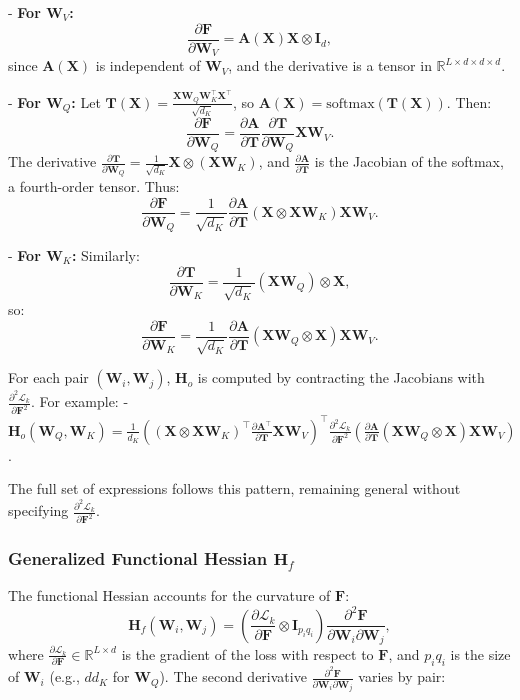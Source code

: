 \documentclass{article}
\begin{document}
- \textbf{For \(\mathbf{W}_V\):}
\[
\frac{\partial \mathbf{F}}{\partial \mathbf{W}_V} = \mathbf{A}(\mathbf{X}) \mathbf{X} \otimes \mathbf{I}_d,
\]
since \(\mathbf{A}(\mathbf{X})\) is independent of \(\mathbf{W}_V\), and the derivative is a tensor in \(\mathbb{R}^{L \times d \times d \times d}\).

- \textbf{For \(\mathbf{W}_Q\):}
Let \(\mathbf{T}(\mathbf{X}) = \frac{\mathbf{X} \mathbf{W}_Q \mathbf{W}_K^\top \mathbf{X}^\top}{\sqrt{d_K}}\), so \(\mathbf{A}(\mathbf{X}) = \text{softmax}(\mathbf{T}(\mathbf{X}))\). Then:
\[
\frac{\partial \mathbf{F}}{\partial \mathbf{W}_Q} = \frac{\partial \mathbf{A}}{\partial \mathbf{T}} \frac{\partial \mathbf{T}}{\partial \mathbf{W}_Q} \mathbf{X} \mathbf{W}_V.
\]
The derivative \(\frac{\partial \mathbf{T}}{\partial \mathbf{W}_Q} = \frac{1}{\sqrt{d_K}} \mathbf{X} \otimes (\mathbf{X} \mathbf{W}_K)\), and \(\frac{\partial \mathbf{A}}{\partial \mathbf{T}}\) is the Jacobian of the softmax, a fourth-order tensor. Thus:
\[
\frac{\partial \mathbf{F}}{\partial \mathbf{W}_Q} = \frac{1}{\sqrt{d_K}} \frac{\partial \mathbf{A}}{\partial \mathbf{T}} (\mathbf{X} \otimes \mathbf{X} \mathbf{W}_K) \mathbf{X} \mathbf{W}_V.
\]

- \textbf{For \(\mathbf{W}_K\):}
Similarly:
\[
\frac{\partial \mathbf{T}}{\partial \mathbf{W}_K} = \frac{1}{\sqrt{d_K}} (\mathbf{X} \mathbf{W}_Q) \otimes \mathbf{X},
\]
so:
\[
\frac{\partial \mathbf{F}}{\partial \mathbf{W}_K} = \frac{1}{\sqrt{d_K}} \frac{\partial \mathbf{A}}{\partial \mathbf{T}} (\mathbf{X} \mathbf{W}_Q \otimes \mathbf{X}) \mathbf{X} \mathbf{W}_V.
\]

For each pair \((\mathbf{W}_i, \mathbf{W}_j)\), \(\mathbf{H}_o\) is computed by contracting the Jacobians with \(\frac{\partial^2 \mathcal{L}_k}{\partial \mathbf{F}^2}\). For example:
- \(\mathbf{H}_o(\mathbf{W}_Q, \mathbf{W}_K) = \frac{1}{d_K} \left( (\mathbf{X} \otimes \mathbf{X} \mathbf{W}_K)^\top \frac{\partial \mathbf{A}^\top}{\partial \mathbf{T}} \mathbf{X} \mathbf{W}_V \right)^\top \frac{\partial^2 \mathcal{L}_k}{\partial \mathbf{F}^2} \left( \frac{\partial \mathbf{A}}{\partial \mathbf{T}} (\mathbf{X} \mathbf{W}_Q \otimes \mathbf{X}) \mathbf{X} \mathbf{W}_V \right)\).

The full set of expressions follows this pattern, remaining general without specifying \(\frac{\partial^2 \mathcal{L}_k}{\partial \mathbf{F}^2}\).

\subsubsection{Generalized Functional Hessian \( \mathbf{H}_f \)}
The functional Hessian accounts for the curvature of \(\mathbf{F}\):
\[
\mathbf{H}_f(\mathbf{W}_i, \mathbf{W}_j) = \left( \frac{\partial \mathcal{L}_k}{\partial \mathbf{F}} \otimes \mathbf{I}_{p_i q_i} \right) \frac{\partial^2 \mathbf{F}}{\partial \mathbf{W}_i \partial \mathbf{W}_j},
\]
where \(\frac{\partial \mathcal{L}_k}{\partial \mathbf{F}} \in \mathbb{R}^{L \times d}\) is the gradient of the loss with respect to \(\mathbf{F}\), and \(p_i q_i\) is the size of \(\mathbf{W}_i\) (e.g., \(d d_K\) for \(\mathbf{W}_Q\)). The second derivative \(\frac{\partial^2 \mathbf{F}}{\partial \mathbf{W}_i \partial \mathbf{W}_j}\) varies by pair:
\end{document}
